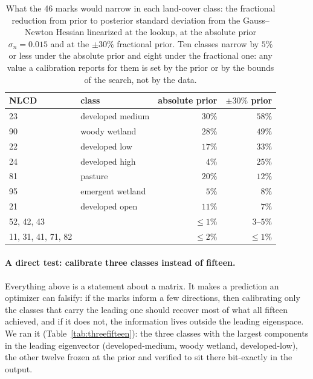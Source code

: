 \documentclass[11pt]{article}
\begin{document}
\begin{table}
\centering\small
\begin{tabular}{@{}llrr@{}}
\toprule
NLCD & class & absolute prior & $\pm 30\%$ prior \\
\midrule
23 & developed medium & $30\%$ & $58\%$ \\
90 & woody wetland & $28\%$ & $49\%$ \\
22 & developed low & $17\%$ & $33\%$ \\
24 & developed high & $4\%$ & $25\%$ \\
81 & pasture & $20\%$ & $12\%$ \\
95 & emergent wetland & $5\%$ & $8\%$ \\
21 & developed open & $11\%$ & $7\%$ \\
52, 42, 43 & & $\le 1\%$ & $3$--$5\%$ \\
11, 31, 41, 71, 82 & & $\le 2\%$ & $\le 1\%$ \\
\bottomrule
\end{tabular}
\caption{What the 46 marks would narrow in each land-cover class: the
fractional reduction from prior to posterior standard deviation from
the Gauss--Newton Hessian linearized at the lookup, at the absolute
prior $\sigma_n = 0.015$ and at the $\pm 30\%$ fractional prior. Ten
classes narrow by $5\%$ or less under the absolute prior and eight
under the fractional one: any value a calibration reports for them
is set by the prior or by the bounds of the search, not by the data.}
\label{tab:learned}
\end{table}

\paragraph{A direct test: calibrate three classes instead of fifteen.}
Everything above is a statement about a matrix. It makes a prediction
an optimizer can falsify: if the marks inform a few directions, then
calibrating only the classes that carry the leading one should
recover most of what all fifteen achieved, and if it does not, the
information lives outside the leading eigenspace. We ran it
(Table~\ref{tab:threefifteen}): the three classes with the largest
components in the leading eigenvector (developed-medium, woody
wetland, developed-low), the other twelve frozen at the prior and
verified to sit there bit-exactly in the output.
\end{document}
